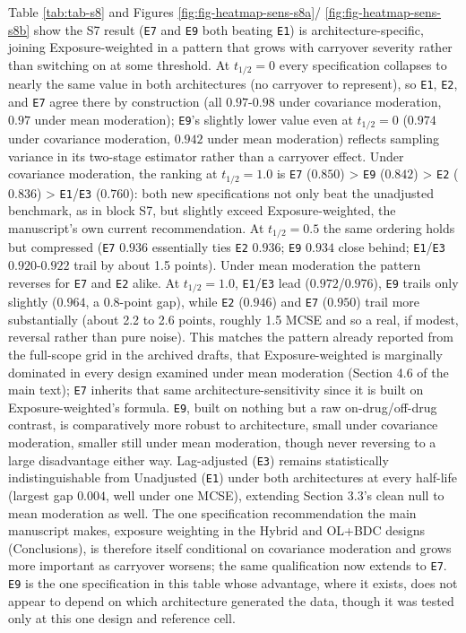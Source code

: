 \documentclass[
  11pt,
]{article}
\begin{document}
Table \ref{tab:tab-s8} and Figures \ref{fig:fig-heatmap-sens-s8a}/
\ref{fig:fig-heatmap-sens-s8b} show the S7 result (\texttt{E7} and \texttt{E9}
both beating \texttt{E1}) is architecture-specific, joining Exposure-weighted
in a pattern that grows with carryover severity rather than
switching on at some threshold. At \(t_{1/2} = 0\) every specification
collapses to nearly the same value in both architectures (no
carryover to represent), so \texttt{E1}, \texttt{E2}, and \texttt{E7} agree there by
construction (all \(0.97\)-\(0.98\) under covariance moderation, \(0.97\)
under mean moderation); \texttt{E9}'s slightly lower value even at
\(t_{1/2} = 0\) (\(0.974\) under covariance moderation, \(0.942\) under
mean moderation) reflects sampling variance in its two-stage estimator
rather than a carryover effect. Under covariance moderation, the ranking at
\(t_{1/2} = 1.0\) is \texttt{E7} (\(0.850\)) \textgreater{} \texttt{E9} (\(0.842\)) \textgreater{} \texttt{E2} (\(0.836\)) \textgreater{}
\texttt{E1}/\texttt{E3} (\(0.760\)): both new specifications not only beat the
unadjusted benchmark, as in block S7, but slightly exceed
Exposure-weighted, the manuscript's own current recommendation. At
\(t_{1/2} = 0.5\) the same ordering holds but compressed (\texttt{E7} \(0.936\)
essentially ties \texttt{E2} \(0.936\); \texttt{E9} \(0.934\) close behind; \texttt{E1}/\texttt{E3}
\(0.920\)-\(0.922\) trail by about 1.5 points). Under mean moderation the
pattern reverses for \texttt{E7} and \texttt{E2} alike. At \(t_{1/2} = 1.0\),
\texttt{E1}/\texttt{E3} lead (\(0.972\)/\(0.976\)), \texttt{E9} trails only slightly (\(0.964\),
a \(0.8\)-point gap), while \texttt{E2} (\(0.946\)) and \texttt{E7} (\(0.950\)) trail
more substantially (about 2.2 to 2.6 points, roughly 1.5 MCSE and so
a real, if modest, reversal rather than pure noise). This matches
the pattern already reported from the full-scope grid in the
archived drafts, that Exposure-weighted is marginally dominated in
every design examined under mean moderation (Section 4.6 of the main
text); \texttt{E7} inherits that same architecture-sensitivity since it is
built on Exposure-weighted's formula. \texttt{E9}, built on nothing but a raw
on-drug/off-drug contrast, is comparatively more robust to
architecture, small under covariance moderation, smaller still under
mean moderation, though never reversing to a large disadvantage
either way. Lag-adjusted (\texttt{E3})
remains statistically indistinguishable from Unadjusted (\texttt{E1}) under
both architectures at every half-life (largest gap \(0.004\), well
under one MCSE), extending Section 3.3's clean null to mean moderation
as well. The one specification recommendation the main manuscript
makes, exposure weighting in the Hybrid and OL+BDC designs
(Conclusions), is therefore itself conditional on covariance
moderation and grows more important as carryover worsens; the same qualification
now extends to \texttt{E7}. \texttt{E9} is the one specification in this table
whose advantage, where it exists, does not appear to depend on which
architecture generated the data, though it was tested only at this
one design and reference cell.
\end{document}
